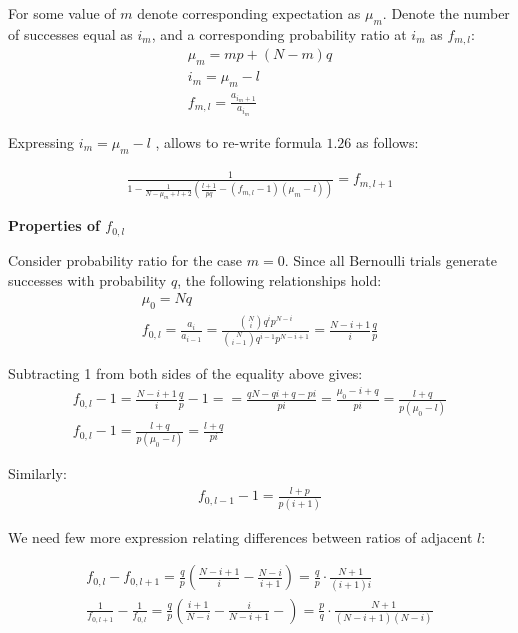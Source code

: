 \documentclass[11pt,draft]{article}
\begin{document}
For some value of $m$ denote corresponding expectation as $\mu_m$.  Denote the number of successes equal as $i_m$, and a corresponding probability ratio at $i_m$ as $f_{m,l}$:
\begin{align}
\mu_m = mp + (N-m)q\\ 
i_m = \mu_m - l \\
f_{m,l} = \frac{a_{{i_m+1}}}{a_{i_m}}
\end{align}

Expressing $i_m=\mu_m-l$ , allows to re-write formula $1.26$  as follows:

\begin{align}
\frac{  1 }{ 1  - \frac{1}{N- \mu_m + l + 2}\left (\frac{l+1}{pq} - (f_{m,l} - 1)(\mu_m-l) \right ) }  = f_{m,l+1} 
\end{align}


\textbf{Properties of $f_{0,l}$}

Consider probability ratio for the case $m=0$.  Since all Bernoulli trials generate successes with probability $q$, the following relationships hold:
\begin{align}
\mu_0 = Nq \\
f_{0,l} = \frac{a_{i}}{a_{i-1}} = \frac{\binom{N}{i} q^{i}p^{N-i }}{\binom{N}{i-1} q^{i-1}p^{N-i+1}} = \frac{N-i+1}{i}\frac{q}{p} 
\end{align}

Subtracting 1 from both sides of the equality above gives:
\begin{align}
f_{0,l} -1 =   \frac{N-i+1}{i}\frac{q}{p}  - 1 =  = \frac{qN - qi + q - pi}{pi} = \frac{\mu_0 - i + q}{pi} = \frac{l + q}{p(\mu_0 - l)} \\
f_{0,l} -1 =   \frac{l + q}{p(\mu_0 - l)} =  \frac{l + q}{pi}
\end{align}

Similarly:
\begin{align}
f_{0,l-1} -1 =   \frac{l + p}{p(i+1)}
\end{align}

We need few more expression relating differences between ratios of adjacent $l$:

\begin{align}
f_{0,l} - f_{0,l+1}=  \frac{q}{p}\left ( \frac{N-i+1}{i} - \frac{N-i}{i+1} \right ) =  \frac{q}{p} \cdot \frac{N+1}{(i+1)i}  \\
\frac{1}{f_{0,l+1}} - \frac{1}{f_{0,l}} = \frac{q}{p}\left ( \frac{i+1}{N-i} - \frac{i}{N-i+1} -\right ) = \frac{p}{q}  \cdot \frac{N+1}{(N-i+1)(N-i)}  
\end{align}
\end{document}
